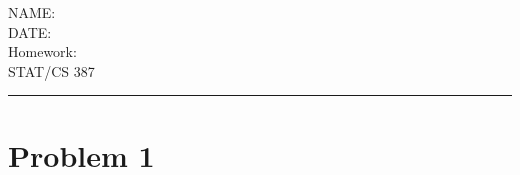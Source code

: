 \documentclass[]{article}
\begin{document}
\noindent NAME:\\
DATE: \\
Homework:\\
STAT/CS 387

\hrule

\section*{Problem 1}
\end{document}
